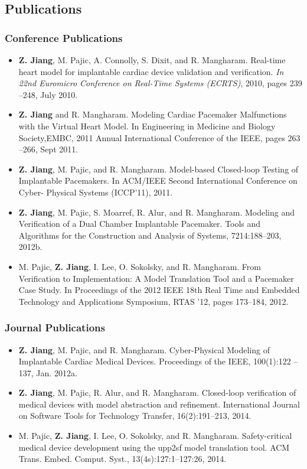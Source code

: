 \documentclass[a4paper,11pt]{article}
\begin{document}
\subsection{Publications}
\subsubsection{Conference Publications}
\begin{itemize}
\item \textbf{Z. Jiang}, M. Pajic, A. Connolly, S. Dixit, and R. Mangharam. Real-time heart model for implantable cardiac device validation and verification. \emph{In 22nd Euromicro Conference on Real-Time Systems (ECRTS)}, 2010, pages 239 –248, July 2010.
\item \textbf{Z. Jiang} and R. Mangharam. Modeling Cardiac Pacemaker Malfunctions with the
Virtual Heart Model. In Engineering in Medicine and Biology Society,EMBC,
2011 Annual International Conference of the IEEE, pages 263 –266, Sept 2011.
\item \textbf{Z. Jiang}, M. Pajic, and R. Mangharam. Model-based Closed-loop Testing of Implantable
Pacemakers. In ACM/IEEE Second International Conference on Cyber-
Physical Systems (ICCP’11), 2011.

\item \textbf{Z. Jiang}, M. Pajic, S. Moarref, R. Alur, and R. Mangharam. Modeling and Verification of a Dual Chamber Implantable Pacemaker. Tools and Algorithms for the
Construction and Analysis of Systems, 7214:188–203, 2012b.
\item M. Pajic, \textbf{Z. Jiang}, I. Lee, O. Sokolsky, and R. Mangharam. From Verification to
Implementation: A Model Translation Tool and a Pacemaker Case Study. In Proceedings
of the 2012 IEEE 18th Real Time and Embedded Technology and Applications
Symposium, RTAS ’12, pages 173–184, 2012.
\end{itemize}
\subsubsection{Journal Publications}
\begin{itemize}
\item \textbf{Z. Jiang}, M. Pajic, and R. Mangharam. Cyber-Physical Modeling of Implantable
Cardiac Medical Devices. Proceedings of the IEEE, 100(1):122 –137, Jan. 2012a.
\item \textbf{Z. Jiang}, M. Pajic, R. Alur, and R. Mangharam. Closed-loop verification of medical
devices with model abstraction and refinement. International Journal on Software
Tools for Technology Transfer, 16(2):191–213, 2014.
\item M. Pajic, \textbf{Z. Jiang}, I. Lee, O. Sokolsky, and R. Mangharam. Safety-critical medical
device development using the upp2sf model translation tool. ACM Trans. Embed.
Comput. Syst., 13(4s):127:1–127:26, 2014.
\end{itemize}
\end{document}
